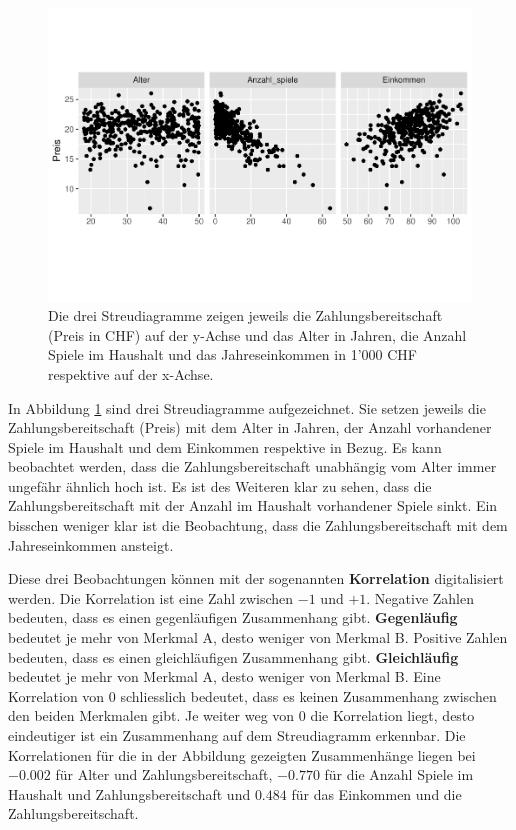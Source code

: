 \documentclass[
]{book}
\theoremstyle{definition}
\theoremstyle{definition}
\theoremstyle{definition}
\theoremstyle{definition}
\theoremstyle{remark}
\begin{document}
\begin{figure}
\centering
\includegraphics{aps_statistik1_files/figure-latex/exm-zahlungsbereitschaft-streudiagramm-1.pdf}
\caption{\label{fig:exm-zahlungsbereitschaft-streudiagramm}Die drei Streudiagramme zeigen jeweils die Zahlungsbereitschaft (Preis in CHF) auf der y-Achse und das Alter in Jahren, die Anzahl Spiele im Haushalt und das Jahreseinkommen in 1'000 CHF respektive auf der x-Achse.}
\end{figure}

In Abbildung \ref{fig:exm-zahlungsbereitschaft-streudiagramm} sind drei Streudiagramme aufgezeichnet. Sie setzen jeweils die Zahlungsbereitschaft (Preis) mit dem Alter in Jahren, der Anzahl vorhandener Spiele im Haushalt und dem Einkommen respektive in Bezug. Es kann beobachtet werden, dass die Zahlungsbereitschaft unabhängig vom Alter immer ungefähr ähnlich hoch ist. Es ist des Weiteren klar zu sehen, dass die Zahlungsbereitschaft mit der Anzahl im Haushalt vorhandener Spiele sinkt. Ein bisschen weniger klar ist die Beobachtung, dass die Zahlungsbereitschaft mit dem Jahreseinkommen ansteigt.

\label{customdef-korrelation}{Diese drei Beobachtungen können mit der sogenannten \textbf{Korrelation} digitalisiert werden.} Die Korrelation ist eine Zahl zwischen \(-1\) und \(+1\). Negative Zahlen bedeuten, dass es einen gegenläufigen Zusammenhang gibt. \label{customdef-gegenlaeufig}{\textbf{Gegenläufig} bedeutet je mehr von Merkmal A, desto weniger von Merkmal B.} Positive Zahlen bedeuten, dass es einen gleichläufigen Zusammenhang gibt. \label{customdef-gleichlaeufig}{\textbf{Gleichläufig} bedeutet je mehr von Merkmal A, desto weniger von Merkmal B.} Eine Korrelation von \(0\) schliesslich bedeutet, dass es keinen Zusammenhang zwischen den beiden Merkmalen gibt. Je weiter weg von \(0\) die Korrelation liegt, desto eindeutiger ist ein Zusammenhang auf dem Streudiagramm erkennbar. Die Korrelationen für die in der Abbildung gezeigten Zusammenhänge liegen bei \(-0.002\) für Alter und Zahlungsbereitschaft, \(-0.770\) für die Anzahl Spiele im Haushalt und Zahlungsbereitschaft und \(0.484\) für das Einkommen und die Zahlungsbereitschaft.
\end{document}
